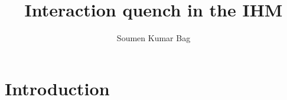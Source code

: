 \documentclass{article}
\title{\bf{Interaction quench in the IHM}}
\author{Soumen Kumar Bag}
\begin{document}
\maketitle
\section{Introduction}



%
%
%
%
%
%


%



\end{document}
